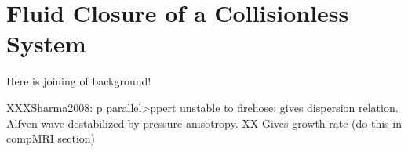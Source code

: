 \chapter{Fluid Closure of a Collisionless System}
Here is joining of background!



XXXSharma2008:
p parallel>ppert unstable to firehose: gives dispersion relation. Alfven wave destabilized by pressure anisotropy. XX Gives growth rate (do this in compMRI section)
